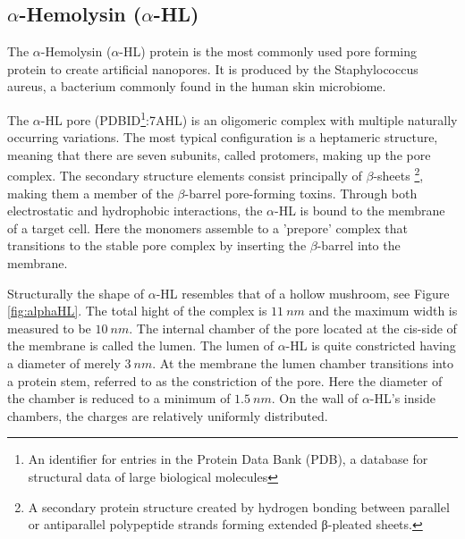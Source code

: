 \subsection{$\alpha$-Hemolysin ($\alpha$-HL)}

The $\alpha$-Hemolysin ($\alpha$-HL) protein is the most commonly used pore forming
protein to create artificial nanopores. It is produced by the Staphylococcus aureus, a
bacterium commonly found in the human skin microbiome.\cite{Bhakdi1991}

The $\alpha$-HL pore (PDBID\footnote{An identifier for entries in the Protein Data Bank
(PDB), a database for structural data of large biological
molecules}:7AHL\cite{Song1859}) is an oligomeric complex
with multiple naturally occurring variations. The most typical configuration
is a heptameric structure, meaning that there are seven subunits, called protomers,
making up the pore complex.
The secondary structure elements consist principally of $\beta$-sheets \footnote{A
secondary protein structure created by hydrogen bonding between parallel or
antiparallel polypeptide strands forming extended β-pleated sheets.}, making
them a member of the $\beta$-barrel pore-forming toxins. Through both electrostatic and
hydrophobic interactions, the $\alpha$-HL is bound to the membrane of a target cell. Here
the monomers assemble to a 'prepore' complex that transitions to the stable pore complex
by inserting the $\beta$-barrel into the membrane.\cite{SUGAWARA2015226}

Structurally the shape of $\alpha$-HL resembles that of a hollow mushroom, see Figure
\ref{fig:alphaHL}. The total hight of the complex is $11\ nm$ and the maximum width is
measured to be $10\ nm$. The
internal chamber of the pore located at the cis-side of the membrane is called the lumen.
The lumen of $\alpha$-HL is quite constricted having a diameter of merely $3\ nm$.  At
the membrane the lumen chamber transitions into a protein stem, referred to as the
constriction of the pore. Here the diameter of the chamber is reduced to a minimum of
$1.5\ nm$. On the wall of $\alpha$-HL's inside chambers, the charges are relatively
uniformly distributed. \vspace{.4cm}

